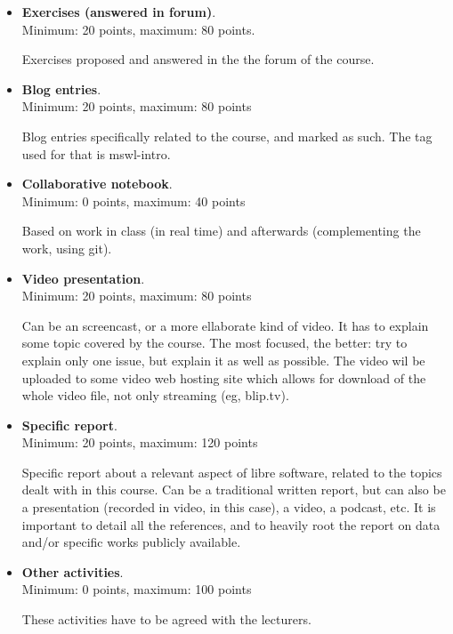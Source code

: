 \documentclass[a4paper]{article}
\begin{document}
\begin{itemize}
\item \textbf{Exercises (answered in forum)}. \\
  Minimum: 20 points, maximum: 80 points.

  Exercises proposed and answered in the the forum of the course.

\item \textbf{Blog entries}. \\
  Minimum: 20 points, maximum: 80 points

  Blog entries specifically related to the course, and marked as such. The tag used for that is mswl-intro.

\item \textbf{Collaborative notebook}. \\
  Minimum: 0 points, maximum: 40 points

  Based on work in class (in real time) and afterwards (complementing the work, using git).

\item \textbf{Video presentation}. \\
  Minimum: 20 points, maximum: 80 points

  Can be an screencast, or a more ellaborate kind of video. It has to explain some topic covered by the course. The most focused, the better: try to explain only one issue, but explain it as well as possible. The video wil be uploaded to some video web hosting site which allows for download of the whole video file, not only streaming (eg, blip.tv).

\item \textbf{Specific report}. \\
  Minimum: 20 points, maximum: 120 points

  Specific report about a relevant aspect of libre software, related to the topics dealt with in this course. Can be a traditional written report, but can also be a presentation (recorded in video, in this case), a video, a podcast, etc. It is important to detail all the references, and to heavily root the report on data and/or specific works publicly available.

\item \textbf{Other activities}. \\
  Minimum: 0 points, maximum: 100 points

  These activities have to be agreed with the lecturers.
\end{itemize}
\end{document}

